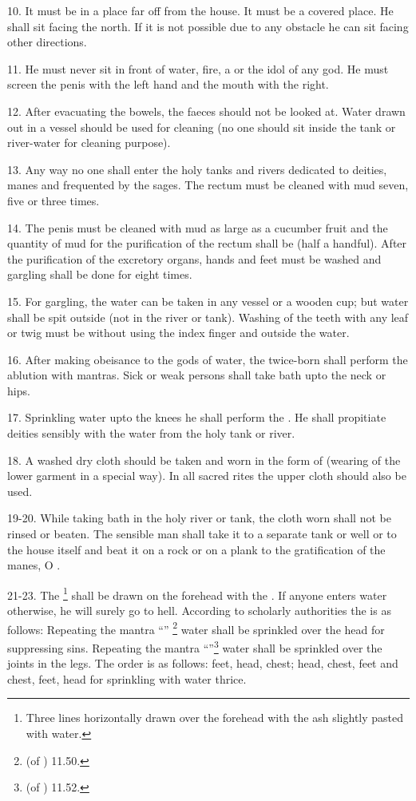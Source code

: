 10. It must be in a place far off from the house. It must be a covered place. He
shall sit facing the north. If it is not possible due to any obstacle he can sit
facing other directions.

11. He must never sit in front of water, fire, a  or the idol of
any god. He must screen the penis with the left hand and the mouth with
the right.

12. After evacuating the bowels, the faeces should not be looked at. Water drawn
out in a vessel should be used for cleaning (\ie no one should sit inside
the tank or river-water for cleaning purpose).

13. Any way no one shall enter the holy tanks and rivers dedicated to deities,
manes \etc and frequented by the sages. The rectum must be cleaned with mud
seven, five or three times.

14. The penis must be cleaned with mud as large as a cucumber fruit and
the quantity of mud for the purification of the rectum shall be 
(half a handful). After the purification of the excretory organs, hands and feet
must be washed and gargling shall be done for eight times.

15. For gargling, the water can be taken in any vessel or a wooden cup; but
water shall be spit outside (not in the river or tank). Washing of the teeth
with any leaf or twig must be without using the index finger and outside
the water.

16. After making obeisance to the gods of water, the twice-born shall perform
the ablution with mantras. Sick or weak persons shall take bath upto the neck
or hips.

17. Sprinkling water upto the knees he shall perform the . He
shall propitiate deities \etc sensibly with the water from the holy tank or
river.

18. A washed dry cloth should be taken and worn in the form of 
(wearing of the lower garment in a special way). In all sacred rites the upper
cloth should also be used.

19-20. While taking bath in the holy river or tank, the cloth worn shall not be
rinsed or beaten. The sensible man shall take it to a separate tank or well or
to the house itself and beat it on a rock or on a plank to the gratification of
the manes, O .

21-23. The \footnote{Three lines horizontally drawn over
the forehead with the ash slightly pasted with water.} shall be drawn on
the forehead with the . If anyone enters water otherwise,
he will surely go to hell. According to scholarly authorities
the  is as follows: Repeating the mantra “”
\footnote{ (of ) 11.50.} \etc water
shall be sprinkled over the head for suppressing sins. Repeating the mantra
“”\footnote{ (of ) 11.52.}
\etc water shall be sprinkled over the joints in the legs. The order is as
follows: feet, head, chest; head, chest, feet and chest, feet, head for
sprinkling with water thrice.

